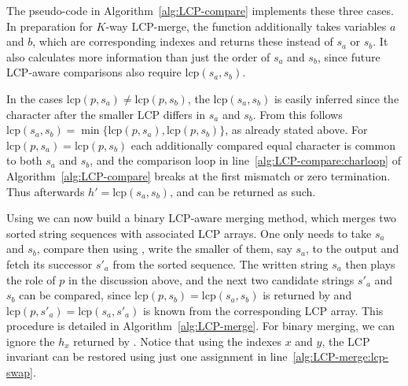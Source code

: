 \documentclass[a4paper]{myjournal}
\newcommand{\lcp}{\mathrm{lcp}}
\begin{document}
The pseudo-code in Algorithm~\ref{alg:LCP-compare} implements these three
cases. In preparation for $K$-way LCP-merge, the function \LCPCompare
additionally takes variables $a$ and $b$, which are corresponding indexes and
returns these instead of $s_a$ or $s_b$. It also calculates more information
than just the order of $s_a$ and $s_b$, since future LCP-aware comparisons also
require $\lcp(s_a,s_b)$.

In the cases $\lcp(p,s_a) \neq \lcp(p,s_b)$, the $\lcp(s_a,s_b)$ is easily
inferred since the character after the smaller LCP differs in $s_a$ and
$s_b$. From this follows $\lcp(s_a,s_b) = \min\{ \lcp(p,s_a), \lcp(p,s_b) \}$, as already
stated above. For $\lcp(p,s_a) = \lcp(p,s_b)$ each additionally compared equal
character is common to both $s_a$ and $s_b$, and the comparison loop in
line~\ref{alg:LCP-compare:charloop} of Algorithm~\ref{alg:LCP-compare} breaks at
the first mismatch or zero termination. Thus afterwards $h' = \lcp(s_a,s_b)$,
and can be returned as such.

Using \LCPCompare we can now build a binary LCP-aware merging method, which
merges two sorted string sequences with associated LCP arrays. One only needs to
take $s_a$ and $s_b$, compare then using \LCPCompare, write the smaller of them,
say $s_a$, to the output and fetch its successor $s'_a$ from the sorted
sequence. The written string $s_a$ then plays the role of $p$ in the
discussion above, and the next two candidate strings $s'_a$ and $s_b$ can be
compared, since $\lcp(p,s_b) = \lcp(s_a,s_b)$ is returned by \LCPCompare and
$\lcp(p,s'_a) = \lcp(s_a,s'_a)$ is known from the corresponding LCP array. This
procedure is detailed in Algorithm~\ref{alg:LCP-merge}. For binary merging, we
can ignore the $h_x$ returned by \LCPCompare. Notice that using the indexes $x$
and $y$, the LCP invariant can be restored using just one assignment in
line~\ref{alg:LCP-merge:lcp-swap}.
\end{document}
